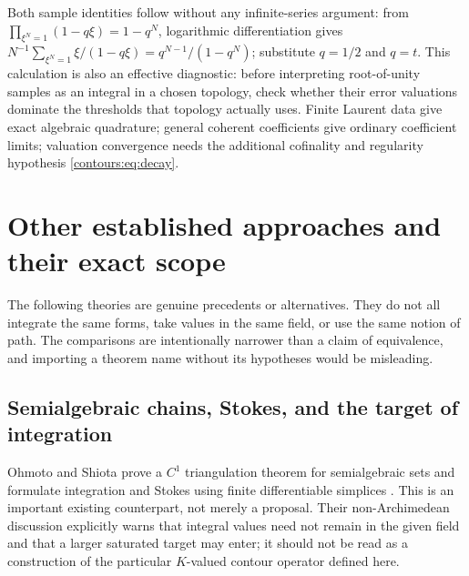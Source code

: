 \documentclass[11pt,letterpaper]{article}
\theoremstyle{definition}
\theoremstyle{remark}
\numberwithin{equation}{section}
\begin{document}
Both sample identities follow without any infinite-series argument: from
$\prod_{\xi^N=1}(1-q\xi)=1-q^N$, logarithmic differentiation gives
$N^{-1}\sum_{\xi^N=1}\xi/(1-q\xi)=q^{N-1}/(1-q^N)$; substitute $q=1/2$ and $q=t$.
This calculation is also an effective diagnostic: before interpreting root-of-unity
samples as an integral in a chosen topology, check whether their error valuations
dominate the thresholds that topology actually uses. Finite Laurent data give exact
algebraic quadrature; general coherent coefficients give ordinary coefficient
limits; valuation convergence needs the additional cofinality and regularity
hypothesis \eqref{contours:eq:decay}.

\section{Other established approaches and their exact scope}
\label{contours:sec:alternatives}

The following theories are genuine precedents or alternatives. They do not all
integrate the same forms, take values in the same field, or use the same notion of
path. The comparisons are intentionally narrower than a claim of equivalence, and
importing a theorem name without its hypotheses would be misleading.

\subsection{Semialgebraic chains, Stokes, and the target of integration}
Ohmoto and Shiota prove a $C^1$ triangulation theorem for semialgebraic sets and
formulate integration and Stokes using finite differentiable simplices
\cite[Thm.~4.1, Prop.~4.2]{OS}. This is an important existing counterpart, not
merely a proposal. Their non-Archimedean discussion explicitly warns that integral
values need not remain in the given field and that a larger saturated target may
enter; it should not be read as a construction of the particular $K$-valued contour
operator defined here.
\end{document}
